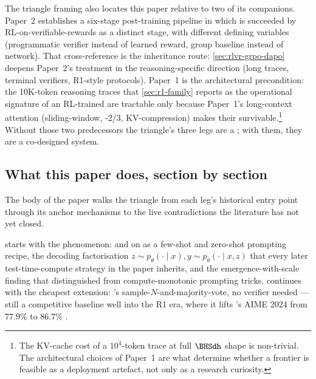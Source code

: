 The triangle framing also locates this paper relative to two of its
companions. Paper~2 establishes a six-stage post-training pipeline in
which  is succeeded by RL-on-verifiable-rewards as a distinct
stage, with different defining variables (programmatic verifier
instead of learned reward, group baseline instead of  network).
That cross-reference is the inheritance route: \cref{sec:rlvr-grpo-dapo}
deepens Paper~2's  treatment in the reasoning-specific direction
(long traces, terminal verifiers, R1-style protocols). Paper~1 is the
architectural precondition: the 10K-token reasoning traces that
\cref{sec:r1-family} reports as the operational signature of an
RL-trained  are tractable only because Paper~1's
long-context attention (sliding-window, -2/3,
KV-compression) makes their  survivable.\footnote{The
KV-cache cost of a $10^4$-token trace at full $\BHSdh$ shape is
non-trivial. The architectural choices of Paper~1 are what determine
whether a frontier  is feasible as a deployment
artefact, not only as a research curiosity.} Without those two
predecessors the triangle's three legs are a ; with them,
they are a co-designed system.

\subsection{What this paper does, section by section}
\label{sec:intro-roadmap}

The body of the paper walks the triangle from each leg's historical
entry point through its anchor mechanisms to the live contradictions
the literature has not yet closed.

 starts with the phenomenon: \citet{wei2022-cot}
and \citet{kojima2022} on\linebreak[0]  as a few-shot and zero-shot
prompting recipe, the decoding factorisation $z \sim p_\theta(\cdot
\mid x), y \sim p_\theta(\cdot \mid x, z)$ that every later
test-time-compute strategy in the paper inherits, and the
emergence-with-scale finding that distinguished  from
compute-monotonic prompting tricks. 
continues with the cheapest extension: \citet{wang2022-self-consistency}'s
sample-$N$-and-majority-vote, no verifier needed --- still a competitive
baseline well into the R1 era, where it lifts 's AIME 2024 from
$77.9\%$ to $86.7\%$ \citep[\S 2.3]{deepseek-r1}.

